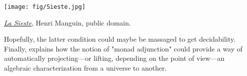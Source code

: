 \conjAdjunctionControlledRelations*

\begin{marginfigure}
	\centering
	\texttt{[image: fig/Sieste.jpg]}
	\caption{\href{https://commons.wikimedia.org/wiki/File:Henri_Manguin,_1905,_La_Sieste_(Le_repos,_Jeanne),_oil_on_canvas,_88.9_x_116.84_cm,_Villa_Flora,_Winterthur.jpg}{\emph{La Sieste}}, Henri Manguin, public domain.}
\end{marginfigure}
Hopefully, the latter condition could maybe be massaged to get decidability.
Finally,  explains how the notion
of "monad adjunction" could provide a way of automatically projecting---or lifting,
depending on the point of view---an algebraic characterization from a universe to another.

\projectingAlgebraicCharacterization*